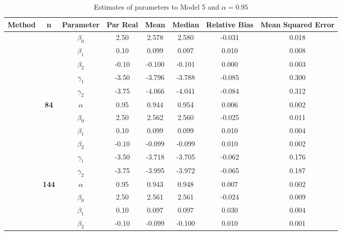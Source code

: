 \begin{table}[h]

\caption{\label{tab:Est_model_5_Alpha0.95}Estimates of parameters to Model 5 and $\alpha=0.95$}
\centering
\begin{tabular}[t]{>{}c>{}ccccccc}
\toprule
Method & n & Parameter & Par Real & Mean & Median & Relative Bias & Mean Squared Error\\
\midrule
 &  & $\beta_0$ & 2.50 & 2.578 & 2.580 & -0.031 & 0.018\\

 &  & $\beta_1$ & 0.10 & 0.099 & 0.097 & 0.010 & 0.008\\

 &  & $\beta_2$ & -0.10 & -0.100 & -0.101 & 0.000 & 0.003\\

 &  & $\gamma_1$ & -3.50 & -3.796 & -3.788 & -0.085 & 0.300\\

 &  & $\gamma_2$ & -3.75 & -4.066 & -4.041 & -0.084 & 0.312\\

 & \multirow{-6}{*}{\centering\arraybackslash \textbf{84}} & $\alpha$ & 0.95 & 0.944 & 0.954 & 0.006 & 0.002\\

 &  & $\beta_0$ & 2.50 & 2.562 & 2.560 & -0.025 & 0.011\\

 &  & $\beta_1$ & 0.10 & 0.099 & 0.099 & 0.010 & 0.004\\

 &  & $\beta_2$ & -0.10 & -0.099 & -0.099 & 0.010 & 0.002\\

 &  & $\gamma_1$ & -3.50 & -3.718 & -3.705 & -0.062 & 0.176\\

 &  & $\gamma_2$ & -3.75 & -3.995 & -3.972 & -0.065 & 0.187\\

 & \multirow{-6}{*}{\centering\arraybackslash \textbf{144}} & $\alpha$ & 0.95 & 0.943 & 0.948 & 0.007 & 0.002\\

 &  & $\beta_0$ & 2.50 & 2.561 & 2.561 & -0.024 & 0.009\\

 &  & $\beta_1$ & 0.10 & 0.097 & 0.097 & 0.030 & 0.004\\

 &  & $\beta_2$ & -0.10 & -0.099 & -0.100 & 0.010 & 0.001\\


\end{tabular}
\end{table}

